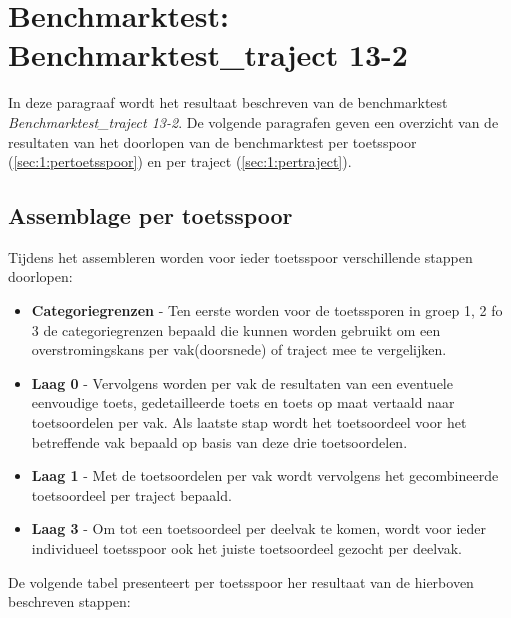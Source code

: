 \section{Benchmarktest: Benchmarktest\_traject 13-2}
	\label{ch:benchmarktTest1}
In deze paragraaf wordt het resultaat beschreven van de benchmarktest \textit{Benchmarktest\_traject 13-2}. De volgende paragrafen geven een overzicht van de resultaten van het doorlopen van de benchmarktest per toetsspoor (\autoref{sec:1:pertoetsspoor}) en per traject (\autoref{sec:1:pertraject}).

\subsection{Assemblage per toetsspoor}
	\label{sec:1:pertoetsspoor}
Tijdens het assembleren worden voor ieder toetsspoor verschillende stappen doorlopen:
\begin{itemize}
	\item \textbf{Categoriegrenzen} - Ten eerste worden voor de toetssporen in groep 1, 2 fo 3 de categoriegrenzen bepaald die kunnen worden gebruikt om een overstromingskans per vak(doorsnede) of traject mee te vergelijken.
	\item \textbf{Laag 0} - Vervolgens worden per vak de resultaten van een eventuele eenvoudige toets, gedetailleerde toets en toets op maat vertaald naar toetsoordelen per vak. Als laatste stap wordt het toetsoordeel voor het betreffende vak bepaald op basis van deze drie toetsoordelen.
	\item \textbf{Laag 1} - Met de toetsoordelen per vak wordt vervolgens het gecombineerde toetsoordeel per traject bepaald.
	\item \textbf{Laag 3} - Om tot een toetsoordeel per deelvak te komen, wordt voor ieder individueel toetsspoor ook het juiste toetsoordeel gezocht per deelvak.
\end{itemize}

De volgende tabel presenteert per toetsspoor her resultaat van de hierboven beschreven stappen:

